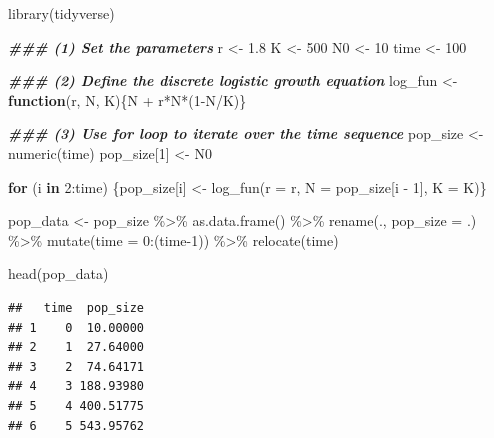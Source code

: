 \documentclass[
]{book}
\newenvironment{Shaded}{\begin{snugshade}}{\end{snugshade}}
\newcommand{\AttributeTok}[1]{\textcolor[rgb]{0.77,0.63,0.00}{#1}}
\newcommand{\ControlFlowTok}[1]{\textcolor[rgb]{0.13,0.29,0.53}{\textbf{#1}}}
\newcommand{\DecValTok}[1]{\textcolor[rgb]{0.00,0.00,0.81}{#1}}
\newcommand{\DocumentationTok}[1]{\textcolor[rgb]{0.56,0.35,0.01}{\textbf{\textit{#1}}}}
\newcommand{\FloatTok}[1]{\textcolor[rgb]{0.00,0.00,0.81}{#1}}
\newcommand{\FunctionTok}[1]{\textcolor[rgb]{0.00,0.00,0.00}{#1}}
\newcommand{\NormalTok}[1]{#1}
\newcommand{\OtherTok}[1]{\textcolor[rgb]{0.56,0.35,0.01}{#1}}
\newcommand{\SpecialCharTok}[1]{\textcolor[rgb]{0.00,0.00,0.00}{#1}}
\newcommand{\StringTok}[1]{\textcolor[rgb]{0.31,0.60,0.02}{#1}}
\begin{document}
\begin{Shaded}
\begin{Highlighting}[]
\FunctionTok{library}\NormalTok{(tidyverse)}

\DocumentationTok{\#\#\# (1) Set the parameters}
\NormalTok{r }\OtherTok{\textless{}{-}} \FloatTok{1.8}
\NormalTok{K }\OtherTok{\textless{}{-}} \DecValTok{500}
\NormalTok{N0 }\OtherTok{\textless{}{-}} \DecValTok{10}
\NormalTok{time }\OtherTok{\textless{}{-}} \DecValTok{100}

\DocumentationTok{\#\#\# (2) Define the discrete logistic growth equation}
\NormalTok{log\_fun }\OtherTok{\textless{}{-}} \ControlFlowTok{function}\NormalTok{(r, N, K)\{N }\SpecialCharTok{+}\NormalTok{ r}\SpecialCharTok{*}\NormalTok{N}\SpecialCharTok{*}\NormalTok{(}\DecValTok{1}\SpecialCharTok{{-}}\NormalTok{N}\SpecialCharTok{/}\NormalTok{K)\}  }

\DocumentationTok{\#\#\# (3) Use for loop to iterate over the time sequence}
\NormalTok{pop\_size }\OtherTok{\textless{}{-}} \FunctionTok{numeric}\NormalTok{(time)}
\NormalTok{pop\_size[}\DecValTok{1}\NormalTok{] }\OtherTok{\textless{}{-}}\NormalTok{ N0}

\ControlFlowTok{for}\NormalTok{ (i }\ControlFlowTok{in} \DecValTok{2}\SpecialCharTok{:}\NormalTok{time) \{pop\_size[i] }\OtherTok{\textless{}{-}} \FunctionTok{log\_fun}\NormalTok{(}\AttributeTok{r =}\NormalTok{ r, }\AttributeTok{N =}\NormalTok{ pop\_size[i }\SpecialCharTok{{-}} \DecValTok{1}\NormalTok{], }\AttributeTok{K =}\NormalTok{ K)\}}

\NormalTok{pop\_data }\OtherTok{\textless{}{-}}\NormalTok{ pop\_size }\SpecialCharTok{\%\textgreater{}\%} 
  \FunctionTok{as.data.frame}\NormalTok{() }\SpecialCharTok{\%\textgreater{}\%} 
  \FunctionTok{rename}\NormalTok{(., }\AttributeTok{pop\_size =} \StringTok{\textasciigrave{}}\AttributeTok{.}\StringTok{\textasciigrave{}}\NormalTok{) }\SpecialCharTok{\%\textgreater{}\%}
  \FunctionTok{mutate}\NormalTok{(}\AttributeTok{time =} \DecValTok{0}\SpecialCharTok{:}\NormalTok{(time}\DecValTok{{-}1}\NormalTok{)) }\SpecialCharTok{\%\textgreater{}\%}
  \FunctionTok{relocate}\NormalTok{(time)}

\FunctionTok{head}\NormalTok{(pop\_data)}
\end{Highlighting}
\end{Shaded}

\begin{verbatim}
##   time  pop_size
## 1    0  10.00000
## 2    1  27.64000
## 3    2  74.64171
## 4    3 188.93980
## 5    4 400.51775
## 6    5 543.95762
\end{verbatim}
\end{document}
